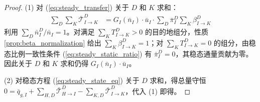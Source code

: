 \documentclass[a4paper,12pt]{article}
\theoremstyle{plain}
\theoremstyle{definition}
\theoremstyle{remark}
\begin{document}
\begin{proof}
(1) 对 (\ref{eq:steady_transfer}) 关于 $D$ 和 $K$ 求和：
\begin{equation}
\begin{aligned}
    \sum_{D} \sum_{K} \bar{\mathcal{T}}_{I \to K}^D &= G_I(\bar{n}_I) \cdot \bar{u}_I \cdot \sum_{D} \bar\pi_I^D \sum_{K} \beta_{I \to K}^D
\end{aligned}
\end{equation}
利用 $\sum_D \bar{n}_I^D / \bar{n}_I = 1$。对满足 $\sum_K T_{I\to K}^D>0$ 的目的地组分，性质 \ref{prop:beta_normalization} 给出 $\sum_K \beta_{I \to K}^D = 1$；对 $\sum_K T_{I\to K}^D=0$ 的组分，由稳态比例一致性条件 (\ref{eq:steady_static_ratio}) 有 $\bar\pi_I^D=0$，其稳态通量贡献为零。因此关于 $D$ 和 $K$ 求和仍得 $G_I(\bar{n}_I) \cdot \bar{u}_I$。

(2) 对稳态方程 (\ref{eq:steady_state_eq}) 关于 $D$ 求和，得总量守恒 $0 = \bar{q}_{g,I} + \sum_{H,D} \bar{\mathcal{T}}_{H \to I}^D - \sum_{K,D} \bar{\mathcal{T}}_{I \to K}^D$，代入 (1) 即得。


\end{proof}
\end{document}
